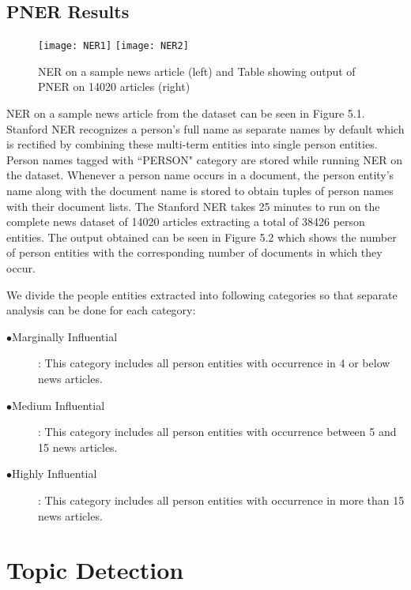 \subsection{PNER Results}

\begin{figure}[h]
\texttt{[image: NER1]}
\texttt{[image: NER2]}
\caption{NER on a sample news article (left) and Table showing output of PNER on 14020 articles (right)}
\end{figure} 

NER on a sample news article from the dataset can be seen in Figure 5.1.
 Stanford NER recognizes a person's full name as separate names by default which is rectified by combining these multi-term entities into single person entities. Person names tagged with ``PERSON" category are stored while running NER on the dataset.
Whenever a person name occurs in a document, the person entity's name along with the document name is stored to obtain tuples of person names with their document lists.
The Stanford NER takes 25 minutes to run on the complete news dataset of 14020 articles extracting a total of 38426 person entities. The output obtained can be seen in Figure 5.2 which shows the number of person entities with the corresponding number of documents in which they occur.  

We divide the people entities extracted into following categories so that separate analysis can be done for each category:
\begin{description}
 \item[$\bullet$Marginally Influential]: This category includes all person entities with occurrence in 4 or below news articles.
\item[$\bullet$Medium Influential]: This category includes all person entities with occurrence between 5 and 15 news articles. 
\item[$\bullet$Highly Influential] : This category includes all person entities with occurrence in more than 15 news articles.
\end{description}



\section{Topic Detection}
\label{topic detection}

